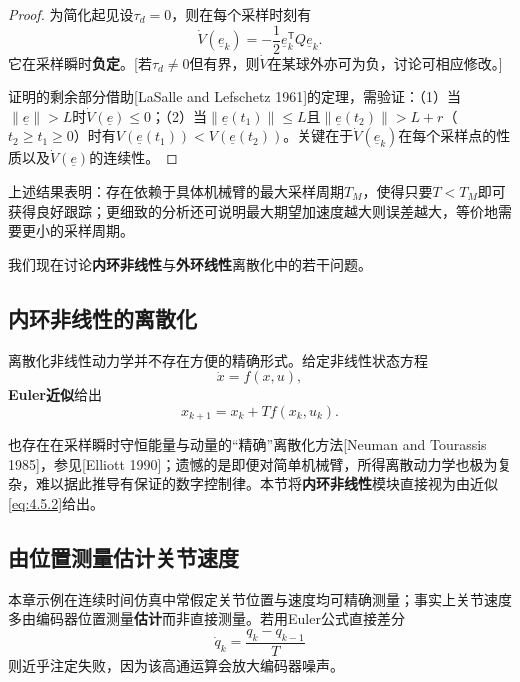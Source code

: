 \documentclass[UTF8]{ctexart}
\theoremstyle{definition}
\begin{document}
\begin{proof}
为简化起见设$\tau_d=0$，则在每个采样时刻有
\begin{equation*}
    \dot{V}(\underline{e}_k)=-\frac{1}{2}\underline{e}_k^{\mathsf{T}}Q\underline{e}_k.
\end{equation*}
它在采样瞬时\textbf{负定}。[若$\tau_d\neq 0$但有界，则$\dot{V}$在某球外亦可为负，讨论可相应修改。]

证明的剩余部分借助[LaSalle and Lefschetz 1961]的定理，需验证：（1）当$\|\underline{e}\|>L$时$\dot{V}(\underline{e})\le 0$；（2）当$\|\underline{e}(t_1)\|\le L$且$\|\underline{e}(t_2)\|>L+r$（$t_2\ge t_1\ge 0$）时有$V(\underline{e}(t_1))<V(\underline{e}(t_2))$。关键在于$\dot{V}(\underline{e}_k)$在每个采样点的性质以及$\dot{V}(\underline{e})$的连续性。
\end{proof}

上述结果表明：存在依赖于具体机械臂的最大采样周期$T_M$，使得只要$T<T_M$即可获得良好跟踪；更细致的分析还可说明最大期望加速度越大则误差越大，等价地需要更小的采样周期。

我们现在讨论\textbf{内环非线性}与\textbf{外环线性}离散化中的若干问题。

\subsection{内环非线性的离散化}

离散化非线性动力学并不存在方便的精确形式。给定非线性状态方程
\begin{equation}\label{eq:4.5.4}
    \dot{x}=f(x,u),
\end{equation}
\textbf{Euler近似}给出
\begin{equation}\label{eq:4.5.5}
    x_{k+1}=x_k+Tf(x_k,u_k).
\end{equation}

也存在在采样瞬时守恒能量与动量的``精确''离散化方法[Neuman and Tourassis 1985]，参见[Elliott 1990]；遗憾的是即便对简单机械臂，所得离散动力学也极为复杂，难以据此推导有保证的数字控制律。本节将\textbf{内环非线性}模块直接视为由近似\eqref{eq:4.5.2}给出。

\subsection{由位置测量估计关节速度}

本章示例在连续时间仿真中常假定关节位置与速度均可精确测量；事实上关节速度多由编码器位置测量\textbf{估计}而非直接测量。若用Euler公式直接差分
\begin{equation}\label{eq:4.5.6}
    \dot{q}_k=\frac{q_k-q_{k-1}}{T}
\end{equation}
则近乎注定失败，因为该高通运算会放大编码器噪声。
\end{document}

